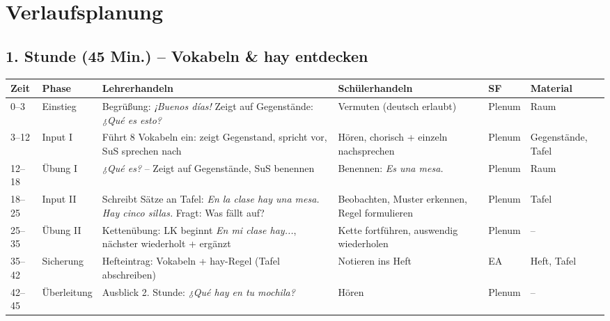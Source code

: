 \documentclass[11pt,a4paper]{article}
\begin{document}
\section{Verlaufsplanung}

\subsection{1. Stunde (45 Min.) -- Vokabeln \& hay entdecken}

\begin{longtable}{|p{0.8cm}|p{1.3cm}|p{4.2cm}|p{3.2cm}|p{1.5cm}|p{1.8cm}|}
\hline
\textbf{Zeit} & \textbf{Phase} & \textbf{Lehrerhandeln} & \textbf{Schülerhandeln} & \textbf{SF} & \textbf{Material} \\
\hline
\endhead

0--3 & Einstieg & Begrüßung: \textit{¡Buenos días!} Zeigt auf Gegenstände: \textit{¿Qué es esto?} & Vermuten (deutsch erlaubt) & Plenum & Raum \\
\hline

3--12 & Input I & Führt 8 Vokabeln ein: zeigt Gegenstand, spricht vor, SuS sprechen nach & Hören, chorisch + einzeln nachsprechen & Plenum & Gegenstände, Tafel \\
\hline

12--18 & Übung I & \textit{¿Qué es?} -- Zeigt auf Gegenstände, SuS benennen & Benennen: \textit{Es una mesa.} & Plenum & Raum \\
\hline

18--25 & Input II & Schreibt Sätze an Tafel: \textit{En la clase hay una mesa. Hay cinco sillas.} Fragt: Was fällt auf? & Beobachten, Muster erkennen, Regel formulieren & Plenum & Tafel \\
\hline

25--35 & Übung II & Kettenübung: LK beginnt \textit{En mi clase hay...}, nächster wiederholt + ergänzt & Kette fortführen, auswendig wiederholen & Plenum & -- \\
\hline

35--42 & Sicherung & Hefteintrag: Vokabeln + hay-Regel (Tafel abschreiben) & Notieren ins Heft & EA & Heft, Tafel \\
\hline

42--45 & Über\-leitung & Ausblick 2. Stunde: \textit{¿Qué hay en tu mochila?} & Hören & Plenum & -- \\
\hline
\end{longtable}
\end{document}
